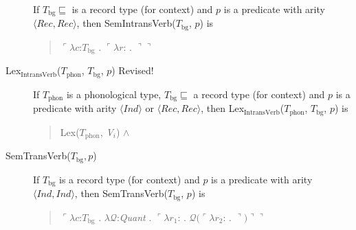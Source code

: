\begin{description}
        If $T_{\text{bg}}\sqsubseteq$ is a record type (for context) and $p$ is a
        predicate with arity $\langle\textit{Rec}, \textit{Rec}\rangle$, then SemIntransVerb($T_{\mathrm{bg}}$, $p$) is
        \begin{quote}
          $\ulcorner\lambda c$:$T_{\mathrm{bg}}$ . $\ulcorner\lambda
          r$:
          . $\urcorner\urcorner$
        \end{quote}

        
      \item[\textnormal{Lex$_{\mathrm{IntransVerb}}$($T_{\mathrm{phon}}$,
          $T_{\mathrm{bg}}$, $p$)} Revised!] \mbox{}


        If $T_{\mathrm{phon}}$ is a phonological type,
        $T_{\mathrm{bg}}\sqsubseteq$ a record type (for context) and $p$ is a
        predicate with arity $\langle\textit{Ind}\rangle$ or $\langle\textit{Rec}, \textit{Rec}\rangle$, then Lex$_{\mathrm{IntransVerb}}$($T_{\mathrm{phon}}$,
        $T_{\mathrm{bg}}$, $p$) is
        \begin{quote}
          Lex($T_{\mathrm{phon}}$, \textit{V$_i$}) \d{$\wedge$}
        \end{quote}

        
      \item[\textnormal{SemTransVerb($T_{\mathrm{bg}}, p$)}] \mbox{}

        If $T_{\text{bg}}$ is a record type (for context) and $p$ is a
        predicate with arity $\langle\textit{Ind},\textit{Ind}\rangle$, then SemTransVerb($T_{\mathrm{bg}}$, $p$) is
        \begin{quote}
          $\ulcorner\lambda c$:$T_{\mathrm{bg}}$ . $\lambda
          \mathcal{Q}$:\textit{Quant} . $\ulcorner\lambda
          r_1$: . $\mathcal{Q}(\ulcorner\lambda r_2$:
          . $\urcorner)\urcorner\urcorner$
        \end{quote}


\end{description}
